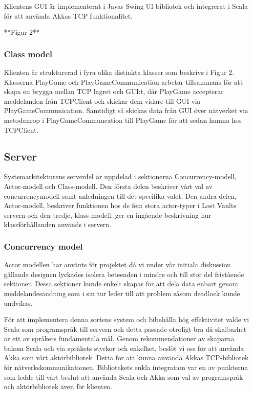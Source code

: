 \documentclass[a4paper]{article}
\begin{document}
Klientens GUI är implementerat i Javas Swing UI bibliotek och integrerat i Scala för att använda Akkas TCP funktionalitet.

**Figur 2**
    
\subsubsection{Class model}
Klienten är strukturerad i fyra olika distinkta klasser som beskrivs i Figur 2. Klasserna PlayGame och PlayGameCommunication arbetar 
tillsammans för att skapa en brygga mellan TCP lagret och GUI:t, där PlayGame accepterar meddelanden från TCPClient och skickar dem 
vidare till GUI via PlayGameCommunication. Samtidigt så skickas data från GUI över nätverket via metodanrop i PlayGameCommuncation till 
PlayGame för att sedan hamna hos TCPClient.

\subsection{Server}
Systemarkitekturens serverdel är uppdelad i sektionerna Concurrency-modell, Actor-modell och Class-modell. Den första delen beskriver vårt 
val av concurrencymodell samt anledningen till det specifika valet. Den andra delen, Actor-modell, beskriver funktionen hos de fem stora actor-typer i Lost Vaults servern och 
den tredje, klass-modell, ger en ingående beskrivning hur klassförhållanden används i servern.

\subsubsection{Concurrency model}
Actor modellen har använts för projektet då vi under vår initiala diskussion gällande designen lyckades isolera beteenden i mindre och till stor del 
fristående sektioner. Dessa sektioner kunde enkelt skapas för att dela data enbart genom meddelandesändning som i sin tur leder till att problem 
såsom deadlock kunde undvikas. 

För att implementera denna sortens system och bibehålla hög effektivitet valde vi Scala som programspråk till servern och detta passade otroligt bra då skalbarhet är ett av språkets fundamentala mål. Genom rekommendationer av skaparna bakom Scala och via språkets styrkor och enkelhet, beslöt vi oss för 
att använda Akka som vårt aktörbibliotek. Detta för att kunna använda Akkas TCP-bibliotek för nätverkskommunikationen. Bibliotekets enkla integration 
var en av punkterna som ledde till vårt beslut att använda Scala och Akka som val av programspråk och aktörbibliotek även för klienten.                    
\end{document}

